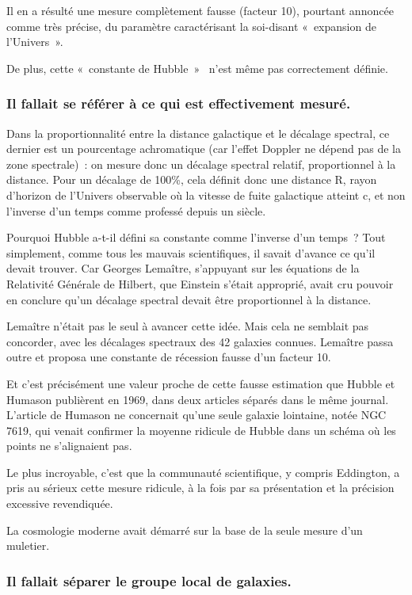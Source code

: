 \documentclass[a4paper,12pt]{article}
\begin{document}
Il en a résulté une mesure complètement fausse (facteur 10), pourtant annoncée comme très précise, du paramètre caractérisant la soi-disant « expansion de l’Univers ».


De plus, cette « constante de Hubble »  n’est m\^eme pas correctement définie.




\subsubsection{Il fallait se référer à ce qui est effectivement mesuré.}

Dans la proportionnalité entre la distance galactique et le décalage spectral, ce dernier est un pourcentage achromatique (car l'effet Doppler ne dépend pas de la zone spectrale) : on mesure donc un décalage spectral relatif, proportionnel à la distance. Pour un décalage de 100\%, cela définit donc une distance R, rayon d'horizon de l'Univers observable où la vitesse de fuite galactique atteint c, et non l'inverse d'un temps comme professé depuis un siècle.


Pourquoi Hubble a-t-il défini sa constante comme l’inverse d’un temps ? Tout simplement, comme tous les mauvais scientifiques, il savait d’avance ce qu’il devait trouver. Car Georges Lema\^itre, s’appuyant sur les équations de la Relativité Générale de Hilbert, que Einstein s’était approprié,  avait cru pouvoir en conclure qu’un décalage spectral devait être proportionnel à la distance.


Lemaître n’était pas le seul à avancer cette idée. Mais cela ne semblait pas concorder, avec les  décalages spectraux des 42 galaxies connues. Lema\^itre passa outre et proposa une constante de récession fausse d’un facteur 10.


Et c’est précisément une valeur proche de cette fausse estimation que Hubble et Humason publièrent en 1969, dans deux articles séparés dans le m\^eme journal. L’article de Humason ne concernait qu’une seule galaxie lointaine, notée NGC 7619, qui venait confirmer la moyenne ridicule de Hubble dans un schéma où les points ne s’alignaient pas. 


Le plus incroyable, c’est que la communauté scientifique, y compris Eddington, a pris au sérieux cette mesure ridicule, à la fois par sa présentation et la précision excessive revendiquée.


La cosmologie moderne avait démarré sur la base de la seule mesure d’un muletier.


\subsubsection{Il fallait séparer le groupe local de galaxies.} 
\end{document}
